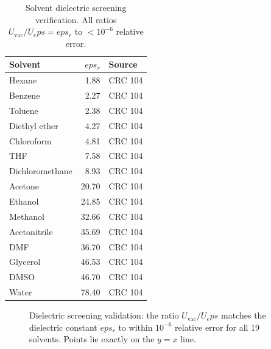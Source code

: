 \documentclass[11pt,twoside]{article}
\def\varepsilon{eps}%
\begin{document}
\begin{table}[H]
\centering
\caption{Solvent dielectric screening verification. All ratios $U_{\mathrm{vac}} / U_\varepsilon = \varepsilon_r$ to $< 10^{-6}$ relative error.}
\label{tab:solvents}
\begin{tabular}{lrl}
\toprule
\textbf{Solvent} & $\varepsilon_r$ & \textbf{Source} \\
\midrule
Hexane          & 1.88  & CRC 104 \\
Benzene         & 2.27  & CRC 104 \\
Toluene         & 2.38  & CRC 104 \\
Diethyl ether   & 4.27  & CRC 104 \\
Chloroform      & 4.81  & CRC 104 \\
THF             & 7.58  & CRC 104 \\
Dichloromethane & 8.93  & CRC 104 \\
Acetone         & 20.70 & CRC 104 \\
Ethanol         & 24.85 & CRC 104 \\
Methanol        & 32.66 & CRC 104 \\
Acetonitrile    & 35.69 & CRC 104 \\
DMF             & 36.70 & CRC 104 \\
Glycerol        & 46.53 & CRC 104 \\
DMSO            & 46.70 & CRC 104 \\
Water           & 78.40 & CRC 104 \\
\bottomrule
\end{tabular}
\end{table}

\begin{figure}[H]
\centering
{}
\caption{Dielectric screening validation: the ratio $U_{\mathrm{vac}}/U_\varepsilon$ matches the dielectric constant $\varepsilon_r$ to within $10^{-6}$ relative error for all 19 solvents. Points lie exactly on the $y = x$ line.}
\label{fig:dielectric}
\end{figure}
\end{document}
